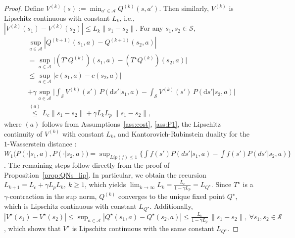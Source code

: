 \documentclass[letterpaper, 10 pt, conference]{ieeeconf}  %
\begin{document}
\begin{proof}
Define $V^{(k)}(s):=\min_{a'\in\mathcal A}Q^{(k)}(s,a')$. Then similarly, $V^{(k)}$ is Lipschitz continuous with constant $L_k$, i.e., $|V^{(k)}(s_1)-V^{(k)}(s_2)|\le L_k\|s_1-s_2\|$. For any $s_1,s_2\in\mathcal S$,
\small
\begin{align*}
&\sup_{a \in \mathcal A}|Q^{(k+1)}(s_1,a)-Q^{(k+1)}(s_2,a)| \\
&=\sup_{a \in \mathcal A}\Big|(T^\star Q^{(k)})(s_1,a)-(T^\star Q^{(k)})(s_2,a)\Big|\\
&\le \sup_{a \in \mathcal A}|c(s_1,a)-c(s_2,a)|\\
& +\gamma\sup_{a \in \mathcal A}
\Big|\int_{\mathcal S} V^{(k)}(s')\,P(\mathrm ds'| s_1,a)
-\int_{\mathcal S} V^{(k)}(s')\,P(\mathrm ds'| s_2,a)\Bigr|\\
&\overset{(a)}{\le} L_c\|s_1-s_2\|
+\gamma L_k L_p\,\big\|s_1 - s_2\big\|,
\end{align*}
\normalsize
where $(a)$ follows from Assumptions\ \ref{ass:cost}, \ref{ass:P1}, the Lipschitz continuity of $V^{(k)}$ with constant $L_k$, and Kantorovich-Rubinstein duality for the $1$-Wasserstein distance \cite{villani2021topics}: $W_1\bigl(P(\cdot| s_1,a),P(\cdot|s_2,a)\bigr)=\sup_{Lip(f)\le 1}\{\int f(s')P(ds'| s_1,a)-\int f(s')P(ds'|s_2,a)\}$. 
The remaining steps follow directly from the proof of Proposition\ \ref{prop:QNs_lip}. In particular, we obtain the recursion $L_{k+1}=L_c+\gamma L_p L_k,\ k\ge 1$, which yields $\lim_{k\to\infty}L_k =  \frac{L_c}{1-\gamma L_p}=L_{Q^\star}$. Since $T^\star$ is a $\gamma$-contraction in the sup norm, $Q^{(k)}$ converges to the unique fixed point $Q^\star$, which is Lipschitz continuous with constant $L_{Q^\star}$. Additionally, $|V^\star(s_1)-V^\star(s_2)|
\le \sup_{a\in\mathcal A}|Q^\star(s_1,a)-Q^\star(s_2,a)|
\le \frac{L_c}{1-\gamma L_p}\,\|s_1-s_2\|,\ \forall s_1,s_2\in\mathcal S$, which shows that $V^\star$ is Lipschitz continuous with the same constant $L_{Q^\star}$.
\end{proof}
\end{document}
